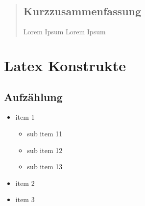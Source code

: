 \documentclass[
							a4paper, 
							11pt, 
							openany, 
							liststotoc,
							parskip=half, 
   							headings=normal
						]{scrreprt}
\begin{document}



\setcounter{secnumdepth}{3}
\renewcommand{\arraystretch}{2}


\begin{abstract}
\section*{Kurzzusammenfassung} \label{se:zusammenfassung}
Lorem Ipsum
Lorem Ipsum
\end{abstract}

\tableofcontents 
\clearpage
{} 
\setcounter{page}{1}

\chapter{Latex Konstrukte} \label{ch:konstrukte}
\section{Aufzählung} \label{se:konstrukte_aufzaehlung}
\begin{itemize}
	\item item 1
	\begin{itemize}
		\item sub item 11
		\item sub item 12
		\item sub item 13
	\end{itemize}
	\item item 2
	\item item 3
\end{itemize}
\clearpage
\end{document}
